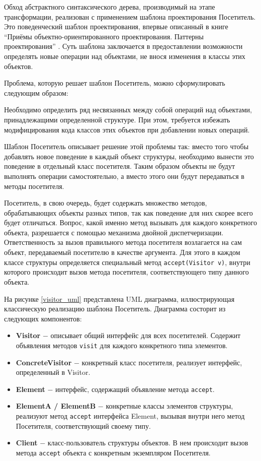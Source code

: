 \documentclass[14pt, a4paper]{article}
\def\code#1{\texttt{#1}} %
\begin{document}
Обход абстрактного синтаксического дерева, производимый на этапе трансформации, реализован с применением
шаблона проектирования Посетитель. Это поведенческий шаблон проектирования, впервые описанный в книге
``Приёмы объектно-ориентированного проектирования. Паттерны проектирования'' \cite{gang_of_4}.
Суть шаблона заключается в предоставлении возможности определять новые операции над объектами,
не внося изменения в классы этих объектов.

Проблема, которую решает шаблон Посетитель, можно сформулировать следующим образом:

Необходимо определить ряд несвязанных между собой операций над объектами, принадлежащими определенной структуре.
При этом, требуется избежать модифицирования кода классов этих объектов при добавлении новых операций.

Шаблон Посетитель описывает решение этой проблемы так:
вместо того чтобы добавлять новое поведение в каждый объект структуры, необходимо вынести это поведение
в отдельный класс посетителя. Таким образом объекты не будут выполнять операции самостоятельно, а вместо этого
они будут передаваться в методы посетителя.

Посетитель, в свою очередь, будет содержать множество методов, обрабатывающих объекты разных типов, так как
поведение для них скорее всего будет отличаться. Вопрос, какой именно метод вызывать для каждого конкретного объекта,
разрешается с помощью механизма двойной диспетчеризации. Ответственность за вызов правильного метода посетителя
возлагается на сам объект, передаваемый посетителю в качестве аргумента. Для этого в каждом классе структуры
определяется специальный метод \code{accept(Visitor v)}, внутри которого происходит вызов метода посетителя, соответствующего
типу данного объекта.

На рисунке \ref{visitor_uml} представлена UML диаграмма, иллюстрирующая классическую реализацию шаблона
Посетитель. Диаграмма состорит из следующих компонентов:
\begin{itemize}
  \item \textbf{Visitor} $-$ описывает общий интерфейс для всех посетителей. Содержит объявления
        методов \code{visit} для каждого конкретного типа элементов.
  \item \textbf{ConcreteVisitor} $-$ конкретный класс посетителя, реализует интерфейс, определенный в Visitor.
  \item \textbf{Element} $-$ интерфейс, содержащий объявление метода \code{accept}.
  \item \textbf{ElementA / ElementB} $-$ конкретные классы элементов структуры, реализуют метод \code{accept}
        интерфейса Element, вызывая внутри него метод Посетителя, соответствующий своему типу.
  \item \textbf{Client} $-$ класс-пользователь структуры объектов. В нем происходит вызов метода \code{accept}
        объекта с конкретным экземпляром Посетителя.
\end{itemize}
\end{document}
